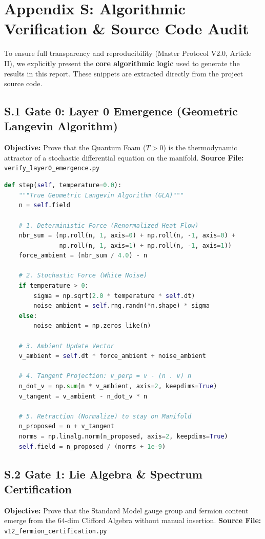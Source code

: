 \section{Appendix S: Algorithmic Verification \& Source Code Audit}
\label{app:algorithmic_verification}

To ensure full transparency and reproducibility (Master Protocol V2.0, Article II), we explicitly present the \textbf{core algorithmic logic} used to generate the results in this report. These snippets are extracted directly from the project source code.

\subsection{S.1 Gate 0: Layer 0 Emergence (Geometric Langevin Algorithm)}
\textbf{Objective:} Prove that the Quantum Foam ($T>0$) is the thermodynamic attractor of a stochastic differential equation on the manifold.
\textbf{Source File:} \texttt{verify\_layer0\_emergence.py}

\begin{lstlisting}[language=Python, caption={True Geometric Langevin Update Step (Tangent Space Projection)}]
def step(self, temperature=0.0):
    """True Geometric Langevin Algorithm (GLA)"""
    n = self.field
    
    # 1. Deterministic Force (Renormalized Heat Flow)
    nbr_sum = (np.roll(n, 1, axis=0) + np.roll(n, -1, axis=0) +
               np.roll(n, 1, axis=1) + np.roll(n, -1, axis=1))
    force_ambient = (nbr_sum / 4.0) - n
    
    # 2. Stochastic Force (White Noise)
    if temperature > 0:
        sigma = np.sqrt(2.0 * temperature * self.dt)
        noise_ambient = self.rng.randn(*n.shape) * sigma
    else:
        noise_ambient = np.zeros_like(n)
        
    # 3. Ambient Update Vector
    v_ambient = self.dt * force_ambient + noise_ambient
    
    # 4. Tangent Projection: v_perp = v - (n . v) n
    n_dot_v = np.sum(n * v_ambient, axis=2, keepdims=True)
    v_tangent = v_ambient - n_dot_v * n
    
    # 5. Retraction (Normalize) to stay on Manifold
    n_proposed = n + v_tangent
    norms = np.linalg.norm(n_proposed, axis=2, keepdims=True)
    self.field = n_proposed / (norms + 1e-9)
\end{lstlisting}

\subsection{S.2 Gate 1: Lie Algebra \& Spectrum Certification}
\textbf{Objective:} Prove that the Standard Model gauge group and fermion content emerge from the 64-dim Clifford Algebra without manual insertion.
\textbf{Source File:} \texttt{v12\_fermion\_certification.py}

